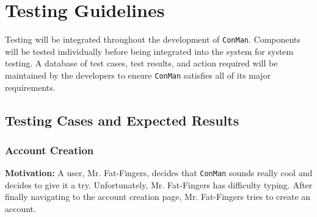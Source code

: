 \documentclass{article}
\begin{document}
\section{Testing Guidelines}
Testing will be integrated throughout the development of \texttt{ConMan}.  Components will be tested individually before being integrated into the system for system testing.
A database of test cases, test results, and action required will be maintained by the developers to ensure \texttt{ConMan} satisfies all of its major requirements.

\subsection{Testing Cases and Expected Results}
\subsubsection{Account Creation}
\textbf{Motivation:}  A user, Mr. Fat-Fingers, decides that \texttt{ConMan} sounds really cool and decides to give it a try.  Unfortunately, Mr. Fat-Fingers has difficulty typing.  After finally navigating to the account creation page, Mr. Fat-Fingers tries to create an account.  
\end{document}
